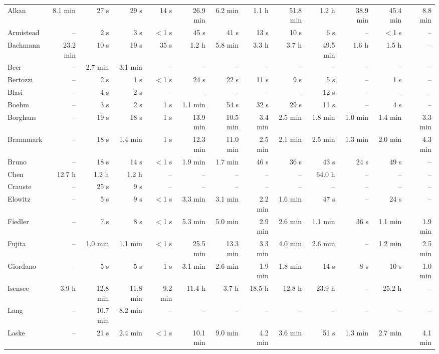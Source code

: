 \begin{longtable}{@{}lrrrrrrrrrrrr@{}}
\midrule
\endhead
Alkan & 8.1 min & 27 s & 29 s & 14 s & 26.9 min & 6.2 min & 1.1 h & 51.8 min & 1.2 h & 38.9 min & 45.4 min & 8.8 min \\
Armistead & -- & 2 s & 3 s & $<$1 s & 45 s & 41 s & 13 s & 10 s & 6 s & -- & $<$1 s & -- \\
Bachmann & 23.2 min & 10 s & 19 s & 35 s & 1.2 h & 5.8 min & 3.3 h & 3.7 h & 49.5 min & 1.6 h & 1.5 h & -- \\
Beer & -- & 2.7 min & 3.1 min & -- & -- & -- & -- & -- & -- & -- & -- & -- \\
Bertozzi & -- & 2 s & 1 s & $<$1 s & 24 s & 22 s & 11 s & 9 s & 5 s & -- & 1 s & -- \\
Blasi & -- & 4 s & 2 s & -- & -- & -- & -- & -- & 12 s & -- & -- & -- \\
Boehm & -- & 3 s & 2 s & 1 s & 1.1 min & 54 s & 32 s & 29 s & 11 s & -- & 4 s & -- \\
Borghans & -- & 19 s & 18 s & 1 s & 13.9 min & 10.5 min & 3.4 min & 2.5 min & 1.8 min & 1.0 min & 1.4 min & 3.3 min \\
Brannmark & -- & 18 s & 1.4 min & 1 s & 12.3 min & 11.0 min & 2.5 min & 2.1 min & 2.5 min & 1.3 min & 2.0 min & 4.3 min \\
Bruno & -- & 18 s & 14 s & $<$1 s & 1.9 min & 1.7 min & 46 s & 36 s & 43 s & 24 s & 49 s & -- \\
Chen & 12.7 h & 1.2 h & 1.2 h & -- & -- & -- & -- & -- & 64.0 h & -- & -- & -- \\
Crauste & -- & 25 s & 9 s & -- & -- & -- & -- & -- & -- & -- & -- & -- \\
Elowitz & -- & 5 s & 9 s & $<$1 s & 3.3 min & 3.1 min & 2.2 min & 1.6 min & 47 s & -- & 24 s & -- \\
Fiedler & -- & 7 s & 8 s & $<$1 s & 5.3 min & 5.0 min & 2.9 min & 2.6 min & 1.1 min & 36 s & 1.1 min & 1.9 min \\
Fujita & -- & 1.0 min & 1.1 min & $<$1 s & 25.5 min & 13.3 min & 3.3 min & 4.0 min & 2.6 min & -- & 1.2 min & 2.5 min \\
Giordano & -- & 5 s & 5 s & 1 s & 3.1 min & 2.6 min & 1.9 min & 1.8 min & 14 s & 8 s & 10 s & 1.0 min \\
Isensee & 3.9 h & 12.8 min & 11.8 min & 9.2 min & 11.4 h & 3.7 h & 18.5 h & 12.8 h & 23.9 h & -- & 25.2 h & -- \\
Lang & -- & 10.7 min & 8.2 min & -- & -- & -- & -- & -- & -- & -- & -- & -- \\
Laske & -- & 21 s & 2.4 min & $<$1 s & 10.1 min & 9.0 min & 4.2 min & 3.6 min & 51 s & 1.3 min & 2.7 min & 4.1 min \\

\end{longtable}
